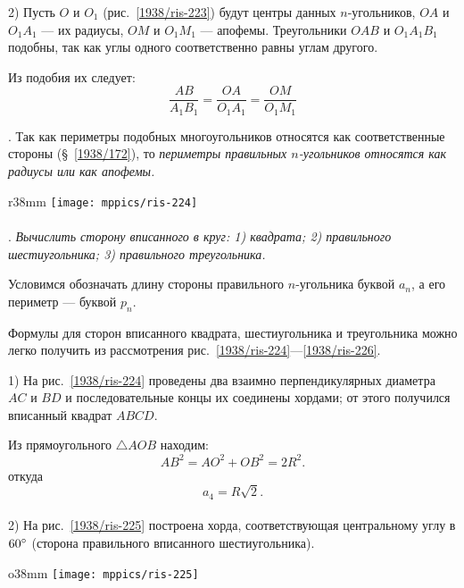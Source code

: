 2) Пусть $O$ и $O_1$ (рис.~\ref{1938/ris-223}) будут центры данных $n$-угольников, $OA$ и $O_1A_1$ — их радиусы, $OM$ и $O_1M_1$ — апофемы.
Треугольники $OAB$ и $O_1A_1B_1$ подобны, так как углы одного соответственно равны углам другого.

Из подобия их следует:
\[\frac{AB}{A_1B_1}=\frac{OA}{O_1A_1} = \frac{OM}{O_1M_1}\]

\smallskip
{}.
Так как периметры подобных многоугольников относятся как соответственные стороны (§~\ref{1938/172}), то \emph{периметры правильных $n$-угольников относятся как радиусы или как апофемы.}


\begin{wrapfigure}{r}{38mm}
\vskip-4mm
\centering
\texttt{[image: mppics/ris-224]}
\caption{}\label{1938/ris-224}
\end{wrapfigure}

\paragraph{}\label{1938/219}
\mbox{.}
\emph{Вычислить сторону вписанного в круг:
1) квадрата;
2) правильного шестиугольника;
3) правильного треугольника.}


Условимся обозначать длину стороны правильного $n$-угольника буквой $a_n$, а его периметр — буквой $p_n$.

{\sloppy
Формулы для сторон вписанного квадрата, шестиугольника и треугольника можно легко получить из рассмотрения рис.~\ref{1938/ris-224}—\ref{1938/ris-226}.

}

1) На рис.~\ref{1938/ris-224} проведены два взаимно перпендикулярных диаметра $AC$ и $BD$ и последовательные концы их соединены хордами;
от этого получился вписанный квадрат $ABCD$.


Из прямоугольного $\triangle AOB$ находим:
\[AB^2=AO^2+OB^2=2R^2.\]
откуда
\[a_4=R\sqrt2.\]

\paragraph{}\label{1938/220}
2) На рис.~\ref{1938/ris-225} построена хорда, соответствующая центральному углу в $60\degree$ (сторона правильного вписанного шестиугольника).

\begin{wrapfigure}{o}{38mm}
\vskip-4mm
\centering
\texttt{[image: mppics/ris-225]}
\caption{}\label{1938/ris-225}
\end{wrapfigure}

